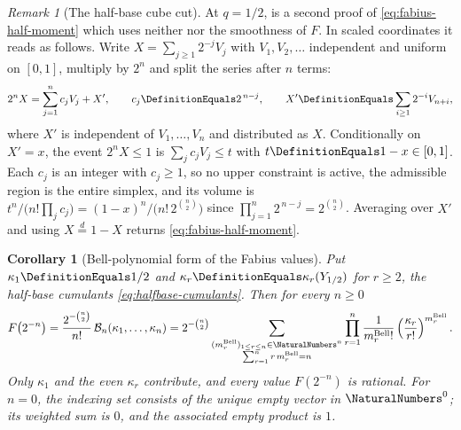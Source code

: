 \documentclass[11pt,a4paper,oneside,openany]{book}
\newtheorem{corollary}[corollary]{Corollary}
\theoremstyle{definition}
\theoremstyle{remark}
\newtheorem{remark}[remark]{Remark}
\newcommand{\BellBlockMultiplicity}[1]{m^{\mathrm{Bell}}_{#1}}
\begin{document}
\begin{remark}[The half-base cube cut]\label{rem:half-moment-cube-cut}
At $q=1/2$,  is a second proof of
\eqref{eq:fabius-half-moment} which uses neither  nor the smoothness
of $F$.  In scaled coordinates it reads as follows.  Write $X=\sum_{j\ge1}2^{-j}V_j$ with
$V_1,V_2,\ldots$ independent and uniform on $[0,1]$, multiply by $2^n$ and split the
series after $n$ terms:
\begin{equation}\label{eq:fabius-scaled-split}
 2^nX=\sum_{j=1}^{n}c_jV_j+X',
 \qquad c_j\DefinitionEquals2^{\,n-j},
 \qquad X'\DefinitionEquals\sum_{i\ge1}2^{-i}V_{n+i},
\end{equation}
where $X'$ is independent of $V_1,\ldots,V_n$ and distributed as $X$.  Conditionally on
$X'=x$, the event $2^nX\le1$ is $\sum_jc_jV_j\le t$ with $t\DefinitionEquals1-x\in[0,1]$.  Each $c_j$
is an integer with $c_j\ge1$, so no upper constraint is active, the admissible region is
the entire simplex, and its volume is
$t^n/\bigl(n!\prod_jc_j\bigr)=(1-x)^n/\bigl(n!\,2^{\binom n2}\bigr)$ since
$\prod_{j=1}^{n}2^{\,n-j}=2^{\binom n2}$.  Averaging over $X'$ and using
$X\overset d=1-X$ returns \eqref{eq:fabius-half-moment}.
\end{remark}

\begin{corollary}[Bell-polynomial form of the Fabius values]\label{cor:fabius-bell-values}
Put $\kappa_1\DefinitionEquals1/2$ and $\kappa_r\DefinitionEquals\kappa_r(Y_{1/2})$ for $r\ge2$, the half-base
cumulants \eqref{eq:halfbase-cumulants}.  Then for every $n\ge0$
\begin{equation}\label{eq:fabius-bell-value}
 F\bigl(2^{-n}\bigr)
 =\frac{2^{-\binom n2}}{n!}\,\mathcal B_n(\kappa_1,\ldots,\kappa_n)
 =2^{-\binom n2}
 \sum_{\substack{
   (\BellBlockMultiplicity{r})_{1\le r\le n}\in\NaturalNumbers^n\\
   \sum_{r=1}^{n}r\,\BellBlockMultiplicity{r}=n}}
 \prod_{r=1}^{n}\frac1{\BellBlockMultiplicity{r}!}
 \left(\frac{\kappa_r}{r!}\right)^{\BellBlockMultiplicity{r}}.
\end{equation}
Only $\kappa_1$ and the even $\kappa_r$ contribute, and every value $F(2^{-n})$ is
rational.  For $n=0$, the indexing set consists of the unique empty vector in
$\NaturalNumbers^0$; its weighted sum is $0$, and the associated empty product is $1$.
\end{corollary}
\end{document}
